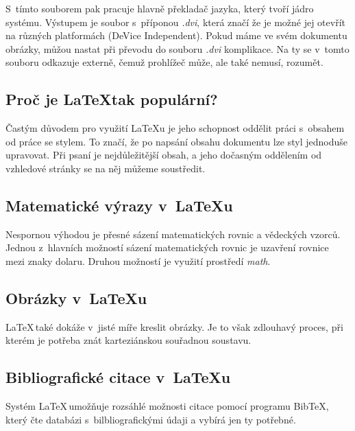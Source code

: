 \documentclass[a4paper, 11pt]{article}
\begin{document}
	S~tímto souborem pak pracuje hlavně překladač jazyka, který tvoří jádro systému. Výstupem je soubor s~příponou \emph{.dvi}, která značí že je možné jej otevřít na různých platformách (DeVice Independent). \cite{LaTeX_pro_zacatecniky}
	Pokud máme ve svém dokumentu obrázky, můžou nastat při převodu do souboru \emph{.dvi} komplikace. Na ty se v~tomto souboru odkazuje externě, čemuž prohlížeč může, ale také nemusí, rozumět. \cite{Sopuch_online}
	
	\subsection{Proč je \LaTeX tak populární?}
	Častým důvodem pro využití \LaTeX u je jeho schopnost oddělit práci s~obsahem od práce se stylem. To značí, že po napsání obsahu dokumentu lze styl jednoduše upravovat. Při psaní je nejdůležitější obsah, a jeho dočasným oddělením od vzhledové stránky se na něj můžeme soustředit. \cite{LaTeX_popular}
	
	\subsection{Matematické výrazy v~\LaTeX u}
	Nespornou výhodou je přesné sázení matematických rovnic a vědeckých vzorců. Jednou z~hlavních možností sázení matematických rovnic je uzavření rovnice mezi znaky dolaru. Druhou možností je využití prostředí \emph{math}. \cite{LaTeX_tutorial}
	
	\subsection{Obrázky v~\LaTeX u}
	\LaTeX \,také dokáže v~jisté míře kreslit obrázky. Je to však zdlouhavý proces, při kterém je potřeba znát karteziánskou souřadnou soustavu. \cite{LaTeX_digital}
	
	\subsection{Bibliografické citace v~\LaTeX u}
	Systém \LaTeX \,umožňuje rozsáhlé možnosti citace pomocí programu Bib\TeX, který čte databázi s~bilbliografickými údaji a vybírá jen ty potřebné. \cite{TeX_pro_pragmatiky}
	
	\newpage
	\renewcommand{\refname}{Použitá literatura}
	
	
\end{document}
